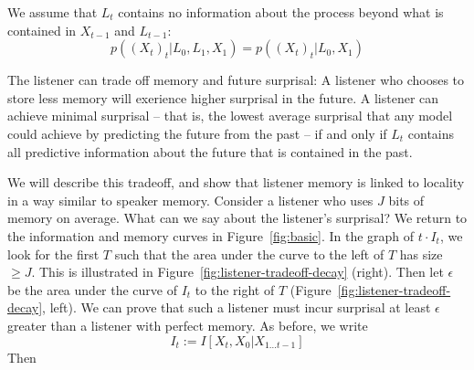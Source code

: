 \documentclass[11pt,letterpaper]{article}
\begin{document}
We assume that $L_t$ contains no information about the process beyond what is contained in $X_{t-1}$ and $L_{t-1}$:
	\begin{equation}\label{eq:listener-markov}
p((X_{t})_t| L_0, L_1, X_1)   = p((X_{t})_t| L_0, X_1)
	\end{equation}

%
%

The listener can trade off memory and future surprisal:
A listener who chooses to store less memory will exerience higher surprisal in the future.
A listener can achieve minimal surprisal -- that is, the lowest average surprisal that any model could achieve by predicting the future from the past -- if and only if $L_t$ contains all predictive information about the future that is contained in the past.

We will describe this tradeoff, and show that listener memory is linked to locality in a way similar to speaker memory.
Consider a listener who uses $J$ bits of memory on average.
What can we say about the listener's surprisal?
We return to the information and memory curves in Figure~\ref{fig:basic}.
In the graph of $t \cdot I_t$, we look for the first $T$ such that the area under the curve to the left of $T$ has size $\geq J$.
This is illustrated in Figure~\ref{fig:listener-tradeoff-decay} (right).
Then let $\epsilon$ be the area under the curve of $I_t$ to the right of $T$ (Figure~\ref{fig:listener-tradeoff-decay}, left).
We can prove that such a listener must incur surprisal at least $\epsilon$ greater than a listener with perfect memory.
As before, we write $$I_t := I[X_t, X_0 | X_{1\dots t-1}]$$
Then
\end{document}
